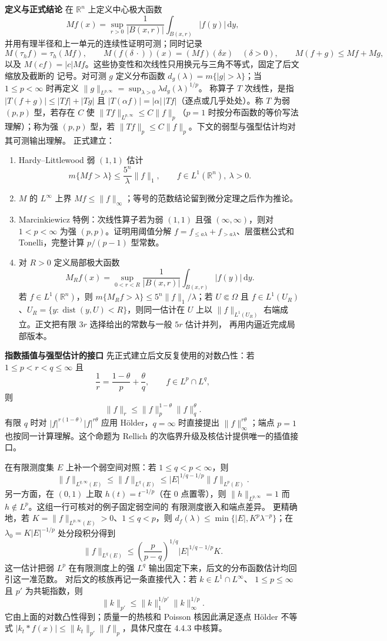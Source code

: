 \documentclass[11pt,a4paper]{ctexart}
\newcommand{\R}{\mathbb R}
\newcommand{\dd}{\,\mathrm d}
\newcommand{\dist}{\operatorname{dist}}
\newcommand{\planitem}[1]{\par\smallskip\noindent\textcolor{deepblue}{\textbf{#1}}\quad}
\begin{document}
\planitem{定义与正式结论}
在 $\R^n$ 上定义中心极大函数
\[
Mf(x)=\sup_{r>0}\frac1{|B(x,r)|}\int_{B(x,r)}|f(y)|\dd y,
\]
并用有理半径和上一单元的连续性证明可测；同时记录
\[
 M(\tau_hf)=\tau_h(Mf),\qquad M(f(\delta\,\cdot))(x)=(Mf)(\delta x)\quad(\delta>0),
 \qquad M(f+g)\le Mf+Mg,
\]
以及 $M(cf)=|c|Mf$。这些协变性和次线性只用换元与三角不等式，固定了后文缩放及截断的
记号。对可测 $g$ 定义分布函数
$d_g(\lambda)=m\{|g|>\lambda\}$；当 $1\le p<\infty$ 时再定义
$\|g\|_{L^{p,\infty}}=\sup_{\lambda>0}\lambda d_g(\lambda)^{1/p}$。
称算子 $T$ 次线性，是指 $|T(f+g)|\le |Tf|+|Tg|$ 且
$|T(\alpha f)|=|\alpha|\,|Tf|$（逐点或几乎处处）。称 $T$ 为弱 $(p,p)$ 型，若存在
$C$ 使 $\|Tf\|_{L^{p,\infty}}\le C\|f\|_p$（$p=1$ 时按分布函数的等价写法理解）；称为强
$(p,p)$ 型，若 $\|Tf\|_p\le C\|f\|_p$。下文的弱型与强型估计均对其可测输出理解。
正式建立：
\begin{enumerate}
\item Hardy--Littlewood 弱 $(1,1)$ 估计
\[
m\{Mf>\lambda\}\le \frac{5^n}{\lambda}\|f\|_1,
\qquad f\in L^1(\R^n),\ \lambda>0.
\]
\item $M$ 的 $L^\infty$ 上界 $Mf\le\|f\|_\infty$；等号的范数结论留到微分定理之后作为推论。
\item Marcinkiewicz 特例：次线性算子若为弱 $(1,1)$ 且强 $(\infty,\infty)$，则对 $1<p<\infty$ 为强 $(p,p)$。证明用阈值分解 $f=f_{\le a\lambda}+f_{>a\lambda}$、层蛋糕公式和 Tonelli，完整计算 $p/(p-1)$ 型常数。
\item 对 $R>0$ 定义局部极大函数
\[
M_Rf(x)=\sup_{0<r<R}\frac1{|B(x,r)|}\int_{B(x,r)}|f(y)|\dd y.
\]
若 $f\in L^1(\mathbb R^n)$，则
$m\{M_Rf>\lambda\}\le5^n\|f\|_1/\lambda$；若 $U\Subset\Omega$ 且
$f\in L^1(U_R)$、$U_R=\{y:\dist(y,U)<R\}$，则同一估计在 $U$ 上以
$\|f\|_{L^1(U_R)}$ 右端成立。正文把有限 $3r$ 选择给出的常数与一般 $5r$ 估计并列，
再用内逼近完成局部版本。
\end{enumerate}

\planitem{指数插值与强型估计的接口}
先正式建立后文反复使用的对数凸性：若 $1\le p<r<q\le\infty$ 且
\[
 \frac1r=\frac{1-\theta}{p}+\frac\theta q,
 \qquad f\in L^p\cap L^q,
\]
则
\[
 \|f\|_r\le \|f\|_p^{1-\theta}\|f\|_q^\theta.
\]
有限 $q$ 时对 $|f|^{r(1-\theta)}|f|^{r\theta}$ 应用 Hölder，$q=\infty$ 时直接提出
$\|f\|_\infty^{r\theta}$；端点 $p=1$ 也按同一计算理解。这个命题为 Rellich 的次临界升级及核估计提供唯一的插值接口。

在有限测度集 $E$ 上补一个弱空间对照：若 $1\le q<p<\infty$，则
\[
 \|f\|_{L^{q,\infty}(E)}
 \le \|f\|_{L^q(E)}
 \le |E|^{1/q-1/p}\|f\|_{L^p(E)}.
\]
另一方面，在 $(0,1)$ 上取 $h(t)=t^{-1/p}$（在 $0$ 点置零），则
$\|h\|_{L^{p,\infty}}=1$ 而 $h\notin L^p$。这组一行可核对的例子固定弱空间的
有限测度嵌入和端点差异。
更精确地，若 $K=\|f\|_{L^{p,\infty}(E)}>0$、$1\le q<p$，则
$d_f(\lambda)\le\min\{|E|,K^p\lambda^{-p}\}$；在
$\lambda_0=K|E|^{-1/p}$ 处分段积分得到
\[
 \|f\|_{L^q(E)}
 \le \left(\frac p{p-q}\right)^{1/q}|E|^{1/q-1/p}K.
\]
这一估计把弱 $L^p$ 在有限测度上的强 $L^q$ 输出固定下来，后文的分布函数估计均回引这一准范数。
对后文的核族再记一条直接代入：若 $k\in L^1\cap L^\infty$、
$1\le p\le\infty$ 且 $p'$ 为共轭指数，则
\[
\|k\|_{p'}\le \|k\|_1^{1/p'}\|k\|_\infty^{1/p}.
\]
它由上面的对数凸性得到；质量一的热核和 Poisson 核因此满足逐点 Hölder 不等式
$|k_t*f(x)|\le\|k_t\|_{p'}\|f\|_p$，具体尺度在 4.4.3 中核算。
\end{document}
